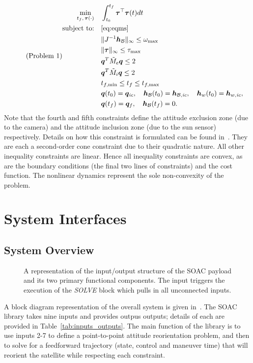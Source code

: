 \documentclass[10pt]{article}
\begin{document}
\begin{equation}\tag{Problem 1}\label{prob:prob1}
\begin{alignedat}{1}
\min_{t_f,\,\bm{\tau}(\cdot)} &\quad \int_{t_0}^{t_f} \bm{\tau}^{\top}\bm{\tau}(t) dt \\
\text{subject to:} &\quad \eqref{eq:eqms} \\
&\quad \| J^{-1}\bm{h}_{\mathcal{B}} \|_{\infty} \leq \omega_{\max} \\
&\quad \| \bm{\tau} \|_{\infty} \leq \tau_{\max} \\
&\quad \bm{q}^T \tilde{M}_e \bm{q} \leq 2 \\
&\quad \bm{q}^T \tilde{M}_i \bm{q} \leq 2 \\
&\quad t_{f,\min} \leq t_f \leq t_{f,\max}\\
&\quad \bm{q}(t_0) = \bm{q}_\textit{ic},\quad \bm{h}_{\mathcal{B}}(t_0)=\bm{h}_{\mathcal{B},\textit{ic}},\quad \bm{h}_w(t_0)=\bm{h}_{w,\textit{ic}}, \\
&\quad \bm{q}(t_f) = \bm{q}_f,\quad \bm{h}_{\mathcal{B}}(t_f) = 0.
\end{alignedat}
\end{equation}
Note that the fourth and fifth constraints define the attitude exclusion zone (due to the camera) and the attitude inclusion zone (due to the sun sensor) respectively. Details on how this constraint is formulated can be found in~\cite{Lee2015}. They are each a second-order cone constraint due to their quadratic nature. All other inequality constraints are linear. Hence all inequality constraints are convex, as are the boundary conditions (the final two lines of constraints) and the cost function. The nonlinear dynamics represent the sole non-convexity of the problem.

\section{System Interfaces}\label{sec:interfaces}

\subsection{System Overview}\label{sec2:sys_overview} 

\begin{figure}[tbh]
\centering

\caption{A representation of the input/output structure of the SOAC payload and its two primary functional components. The input  triggers the execution of the \textit{SOLVE} block which pulls in all unconnected inputs.}
\label{fig:soac_inner}
\end{figure}

A block diagram representation of the overall system is given in~. The SOAC library takes nine inputs and provides outpus outputs; details of each are provided in Table~\ref{tab:inputs_outputs}. The main function of the library is to use inputs 2-7 to define a point-to-point attitude reorientation problem, and then to solve for a feedforward trajectory (state, control and maneuver time) that will reorient the satellite while respecting each constraint. 
\end{document}
